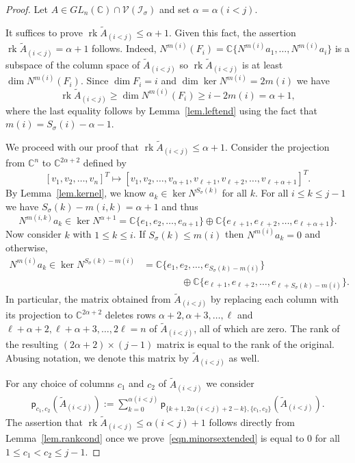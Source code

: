 \documentclass[11pt]{amsart}
\theoremstyle{remark}
\theoremstyle{remark}
\theoremstyle{definition}
\theoremstyle{definition}
\theoremstyle{definition}
\numberwithin{equation}{section}
\newcommand{\C}{\mathbb{C}}           %
\renewcommand{\ker}{\operatorname{ker }}
\newcommand{\rk}{\operatorname{rk}}
\newcommand{\gs}{\sigma}
\newcommand{\ci}{\mathcal{I}}
\newcommand{\cv}{\mathcal{V}}
\newcommand{\al}{\alpha}
\newcommand{\pl}{\mathsf{p}}
\newcommand{\m}[2]{m(#1,#2)}
\newcommand{\mi}[1]{m(#1)}
\begin{document}
\begin{proof} Let $A\in GL_n(\C)\cap\cv(\ci_\gs)$ and set $\al=\al(i<j)$. 

It suffices to prove $\rk \widetilde A_{(i<j)} \leq \al+1$. Given this fact, the assertion $\rk \widetilde A_{(i<j)} = \al+1$ follows. Indeed, $N^{\mi{i}}\left( F_i \right) = \C\{ N^{\mi{i}}a_1, \ldots,N^{\mi{i}}a_i \}$ is a subspace of the column space of $\widetilde A_{(i<j)}$ so $\rk \widetilde A_{(i<j)}$ is at least $\dim N^{\mi{i}}\left( F_i \right)$. Since $\dim F_i = i$ and $\dim \ker N^{\mi{i}} = 2\mi{i}$ we have 
\[
\rk \widetilde A_{(i<j)}  \geq \dim N^{\mi{i}}\left( F_i \right) \geq i - 2\mi{i} = \al +1,
\]
where the last equality follows by Lemma~\ref{lem.leftend} using the fact that $\mi{i}=S_\gs(i)-\al-1$. 

We proceed with our proof that $\rk  \widetilde A_{(i<j)} \leq \al+1$. Consider the projection from $\C^n$ to $\C^{2\al+2}$ defined by
\[
\left[ v_1, v_2, \ldots, v_n\right]^T \mapsto \left[v_1,v_2, \ldots, v_{\al+1}, v_{\ell+1}, v_{\ell+2}, \ldots, v_{\ell+\al+1}\right]^T.
\]
By Lemma~\ref{lem.kernel}, we know $a_k\in \ker N^{S_\gs(k)}$ for all $k$. For all $i\leq k \leq j-1$ we have $S_\gs(k) - \m{i}{k} = \al+1$ and thus
\[
N^{\m{i}{k}} a_k \in \ker N^{\al +1} = \C\{e_1, e_2, \ldots, e_{\al+1}\} \oplus \C\{ e_{\ell+1}, e_{\ell+2}, \ldots, e_{\ell+\al+1}\}.
\]
Now consider $k$ with $1\leq k \leq i$. If $S_\gs(k)\leq \mi{i}$ then $N^{\mi{i}}a_k = 0$ and otherwise,
\begin{align}\label{eqn.Nm(i)}
N^{\mi{i}} a_k \in \ker N^{S_\gs(k)-\mi{i}} &= \C\{e_1, e_2, \ldots, e_{S_\gs(k)-\mi{i}}\} \\ \nonumber
& \qquad \qquad \oplus \C\{e_{\ell+1}, e_{\ell+2}, \ldots, e_{\ell + S_\gs(k)-\mi{i}}\}.
\end{align}
In particular, the matrix obtained from $\widetilde A_{(i<j)}$ by replacing each column with its projection to $\C^{2\al+2}$ deletes rows $\al+2, \al+3, \ldots, \ell$ and $\ell+\al+2, \ell+\al+3, \ldots, 2\ell =n$ of $\widetilde A_{(i<j)}$, all of which are zero.  The rank of the resulting $(2\al+2)\times (j-1)$ matrix is equal to the rank of the original. Abusing notation, we denote this matrix by $\widetilde A_{(i<j)}$ as well. 


For any choice of columns $c_1$ and $c_2$ of $\widetilde A_{(i<j)}$ we consider
\begin{eqnarray}\label{eqn.minorsextended}
\pl_{c_1,c_2}\left(\widetilde A_{(i<j)}\right) := \sum_{k=0}^{\al(i<j)}\pl_{\{k+1, 2\al(i<j)+2-k\}, \{c_1,c_2\}} \left(\widetilde A_{(i<j)}\right) .
\end{eqnarray}
The assertion that $\rk \widetilde A_{(i<j)} \leq \al(i<j)+1$ follows directly from Lemma~\ref{lem.rankcond} once we prove~\eqref{eqn.minorsextended} is equal to $0$ for all $1\leq c_1<c_2\leq j-1$. 


\end{proof}
\end{document}
